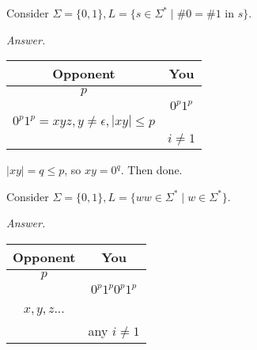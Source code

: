\documentclass[a4paper]{article}
\newenvironment{ans}{\begin{breakbox}\textit{Answer.}}{\end{breakbox}}
\begin{document}
\begin{eg}
    Consider $\Sigma = \{0, 1\}, L = \{s \in \Sigma^* \mid \# 0 = \# 1 \text{ in }s\}$.
\end{eg}

\begin{ans}
    \begin{center}
        \begin{tabular}{|c|c|}
            \hline
            Opponent  & You \\
            \hline
            $p$  &  \\
                 & $0^p1^p$ \\
            $0^p 1^p = xyz, y \ne \epsilon, |xy| \le p$ &  \\
                                                        & $i \ne 1$\\
                                                        \hline
        \end{tabular}
    \end{center}
    $|xy| = q \le p$, so $xy = 0^q$. Then done.
\end{ans}

\begin{eg}
    Consider $\Sigma = \{0, 1\}, L = \{ww \in \Sigma^* \mid w \in \Sigma^*\}$.
\end{eg}

\begin{ans}
    \begin{center}
        \begin{tabular}{|c|c|}
            \hline
            Opponent & You \\
            \hline
            $p$  &  \\
                 & $0^p1^p0^p1^p$ \\
            $x, y, z$...  &  \\
                          & any $i \ne 1$ \\
                          \hline
        \end{tabular}

    \end{center}
\end{ans}
\end{document}

